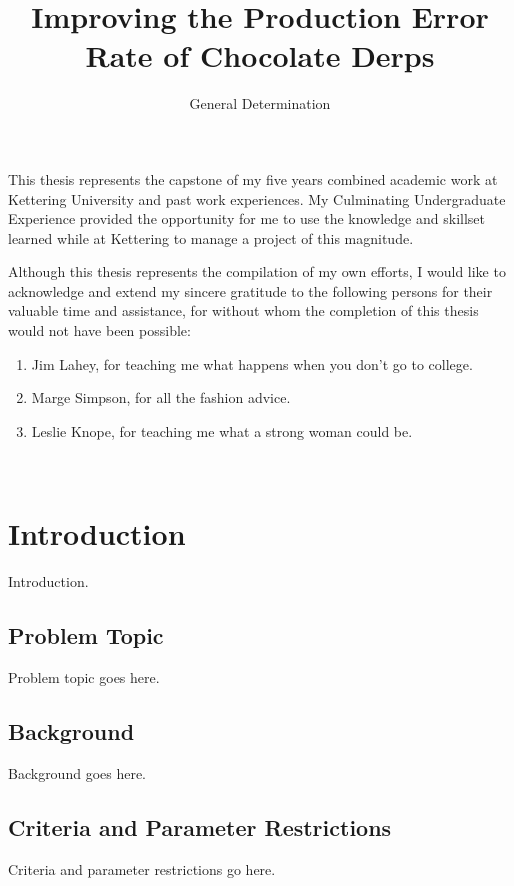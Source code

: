 \documentclass{kuthesis}
\title{Improving the Production Error Rate of Chocolate Derps}
\author{General Determination}
\begin{document}
\maketitle[pp]

\begin{preface}
This thesis represents the capstone of my five years combined academic work 
at Kettering University and past work experiences.  My Culminating 
Undergraduate Experience provided the opportunity for me to use the 
knowledge and skillset learned while at Kettering to manage a project 
of this magnitude.

Although this thesis represents the compilation of my own efforts, I would 
like to acknowledge and extend my sincere gratitude to the following persons 
for their valuable time and assistance, for without whom the completion of 
this thesis would not have been possible:

\begin{enumerate}
  \item Jim Lahey, for teaching me what happens when you don't go to college.
  \item Marge Simpson, for all the fashion advice.
  \item Leslie Knope, for teaching me what a strong woman could be.
\end{enumerate}
\end{preface}

\singlespacing
\tableofcontents\
\listofillustrations

\begincontent

\chapter{Introduction}
Introduction.
\section{Problem Topic}
Problem topic goes here.
\section{Background}
Background goes here.
\section{Criteria and Parameter Restrictions}
Criteria and parameter restrictions go here.
\end{document}
